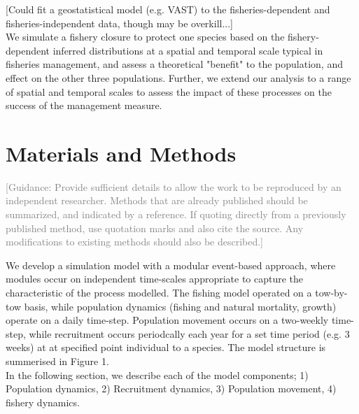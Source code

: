 \documentclass[review]{elsarticle}
\begin{document}
[Could fit a geostatistical model (e.g. VAST) to the fisheries-dependent and
fisheries-independent data, though may be overkill...] \\

We simulate a fishery closure to protect one species based on the
fishery-dependent inferred distributions at a spatial and temporal scale
typical in fisheries management, and assess a theoretical "benefit" to the
population, and effect on the other three populations. Further, we extend our
analysis to a range of spatial and temporal scales to assess the impact of
these processes on the success of the management measure. \\

\section{Materials and Methods}

\textcolor{gray}{[Guidance: Provide sufficient details to allow the work to be
reproduced by an independent researcher. Methods that are already published
should be summarized, and indicated by a reference.  If quoting directly from a
previously published method, use quotation marks and also cite the source. Any
modifications to existing methods should also be described.] \\ }

We develop a simulation model with a modular event-based approach, where
modules occur on independent time-scales appropriate to capture the
characteristic of the process modelled. The fishing model operated on a
tow-by-tow basis, while population dynamics (fishing and natural mortality,
growth) operate on a daily time-step.  Population movement occurs on a
two-weekly time-step, while recruitment occurs periodcally each year for a set
time period (e.g. 3 weeks) at at specified point individual to a species. The
model structure is summerised in Figure 1.\\

In the following section, we describe each of the model components; 1)
Population dynamics, 2) Recruitment dynamics, 3) Population movement, 4)
fishery dynamics.\\
\end{document}
